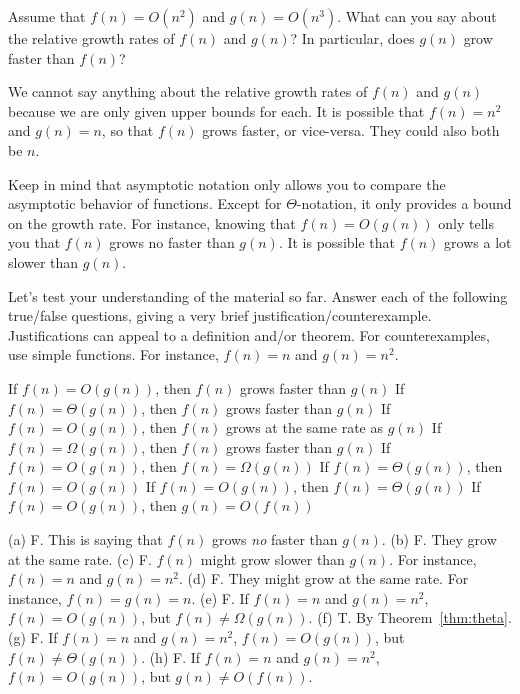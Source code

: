 \begin{exer}
Assume that $f(n)=O(n^2)$ and $g(n)=O(n^3)$.
What can you say about the relative growth rates of $f(n)$ and $g(n)$?
In particular, does $g(n)$ grow faster than $f(n)$?

\noindent
\answerlinethree
\begin{answer}
We cannot say anything about the relative growth rates of $f(n)$ and $g(n)$
because we are only given upper bounds for each. 
It is possible that $f(n)=n^2$ and $g(n)=n$, so that 
$f(n)$ grows faster, or vice-versa.  They could also both be $n$.
\end{answer}
\end{exer}

Keep in mind that asymptotic notation only allows you
to compare the asymptotic behavior of functions.  
Except for $\Theta$-notation, it only provides
a bound on the growth rate.  For instance, knowing that $f(n)=O(g(n))$ only tells
you that $f(n)$ grows no faster than $g(n)$.  
It is possible that $f(n)$ grows a lot slower than $g(n)$.



\begin{exer}
Let's test your understanding of the material so far. Answer each of the following
true/false questions, giving a very brief justification/counterexample.
Justifications can appeal to a definition and/or theorem.
For counterexamples, use simple functions. For instance, $f(n)=n$ and $g(n)=n^2$.
\begin{lenum}
\itemtf
If $f(n)=O(g(n))$, then $f(n)$ grows faster than $g(n)$
\bigbreak
\itemtf
If $f(n)=\Theta(g(n))$, then $f(n)$ grows faster than $g(n)$ 
\bigbreak
\itemtf
If $f(n)=O(g(n))$, then $f(n)$ grows at the same rate as $g(n)$
\bigbreak
\itemtf
If $f(n)=\Omega (g(n))$, then $f(n)$ grows faster than $g(n)$ 
\bigbreak
\itemtf
If $f(n)=O(g(n))$, then $f(n)=\Omega(g(n))$
\bigbreak
\itemtf
If $f(n)=\Theta(g(n))$,  then $f(n)=O(g(n))$
\bigbreak
\itemtf
If $f(n)=O(g(n))$,  then $f(n)=\Theta(g(n))$
\bigbreak
\itemtf
If $f(n)=O(g(n))$,  then $g(n) = O(f(n))$
\end{lenum}
\vspace*{.25in}
\begin{answer}
(a) F. This is saying that $f(n)$ grows {\em no} faster than $g(n)$.
(b) F. They grow at the same rate.
(c) F. $f(n)$ might grow slower than $g(n)$.  For instance, $f(n)=n$ and $g(n)=n^2$.
(d) F. They might grow at the same rate.  For instance, $f(n)=g(n)=n$.
(e) F. If $f(n)=n$ and $g(n)=n^2$, $f(n)=O(g(n))$, but $f(n)\neq \Omega(g(n))$.
(f) T. By Theorem~\ref{thm:theta}.
(g) F. If $f(n)=n$ and $g(n)=n^2$, $f(n)=O(g(n))$, but $f(n)\neq \Theta(g(n))$. 
(h) F. If $f(n)=n$ and $g(n)=n^2$, $f(n)=O(g(n))$, but $g(n)\neq O(f(n))$.
\end{answer}
\end{exer}


